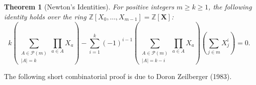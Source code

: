 \documentclass[11pt, a4paper, oneside]{article}
\newtheorem{theorem}{Theorem}
\theoremstyle{remark}
\theoremstyle{lemma}
\begin{document}
\subsection{}\label{A1}
\begin{theorem}[Newton's Identities]
For positive integers \( m\geq k \geq 1 \), the following identity holds over the ring \( \mathbb{Z}[X_0,\ldots,X_{m-1}] = \mathbb{Z}[\mathbf{X}] \):
\[
k\left( \sum_{\substack{A \in \mathscr{P}(m) \\ \left|A\right| = k}} \prod_{a \in A} X_{a} \right)
- \sum_{i=1}^{k} (-1)^{i-1} \left( \sum_{\substack{A \in \mathscr{P}(m) \\ \left|A\right| = k-i}} \prod_{a \in A} X_{a} \right)
\left( \sum_{j \in m} X_j^{i} \right) = 0.
\]
\end{theorem}
The following short combinatorial proof is due to Doron Zeilberger (1983).
\end{document}
